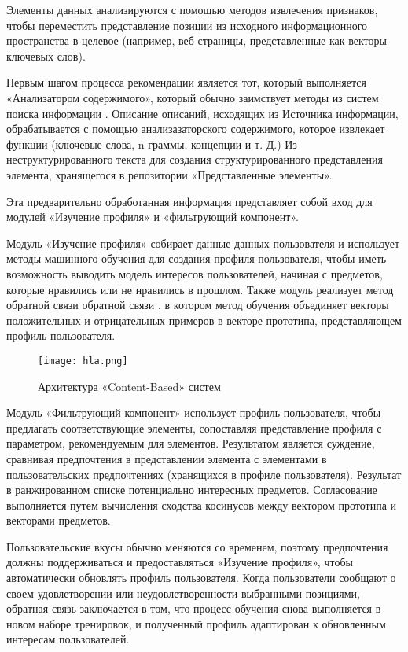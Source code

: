 Элементы данных анализируются с помощью методов извлечения признаков, чтобы переместить представление позиции из исходного информационного пространства в целевое (например, веб-страницы, представленные как векторы ключевых слов).

Первым шагом процесса рекомендации является тот, который выполняется «Анализатором содержимого», который обычно заимствует методы из систем поиска информации \cite{retrieve}. Описание описаний, исходящих из Источника информации, обрабатывается с помощью анализазаторского содержимого, которое извлекает функции (ключевые слова, n-граммы, концепции и т. Д.) Из неструктурированного текста для создания структурированного представления элемента, хранящегося в репозитории «Представленные элементы».

Эта предварительно обработанная информация представляет собой вход для модулей «Изучение профиля» и «фильтрующий компонент».

Модуль «Изучение профиля» собирает данные данных пользователя и использует методы машинного обучения для создания профиля пользователя, чтобы иметь возможность выводить модель интересов пользователей, начиная с предметов, которые нравились или не нравились в прошлом. Также модуль реализует метод обратной связи обратной связи \cite{retrieve}, в котором метод обучения объединяет векторы положительных и отрицательных примеров в векторе прототипа, представляющем профиль пользователя.

\begin{figure}[h]
  \centering
  \texttt{[image: hla.png]}
  \caption{Архитектура «Content-Based» систем}
  \label{image:scheme9}
\end{figure}

Модуль «Фильтрующий компонент» использует профиль пользователя, чтобы предлагать соответствующие элементы, сопоставляя представление профиля с параметром, рекомендуемым для элементов. Результатом является суждение, сравнивая предпочтения в представлении элемента с элементами в пользовательских предпочтениях (хранящихся в профиле пользователя). Результат в ранжированном списке потенциально интересных предметов. Согласование выполняется путем вычисления сходства косинусов между вектором прототипа и векторами предметов.

Пользовательские вкусы обычно меняются со временем, поэтому предпочтения должны поддерживаться и предоставляться «Изучение профиля», чтобы автоматически обновлять профиль пользователя. Когда пользователи сообщают о своем удовлетворении или неудовлетворенности выбранными позициями, обратная связь заключается в том, что процесс обучения снова выполняется в новом наборе тренировок, и полученный профиль адаптирован к обновленным интересам пользователей.
